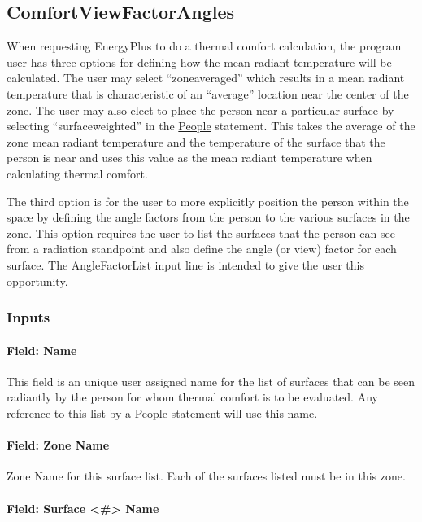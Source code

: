\subsection{ComfortViewFactorAngles}\label{comfortviewfactorangles}

When requesting EnergyPlus to do a thermal comfort calculation, the program user has three options for defining how the mean radiant temperature will be calculated. The user may select ``zoneaveraged'' which results in a mean radiant temperature that is characteristic of an ``average'' location near the center of the zone. The user may also elect to place the person near a particular surface by selecting ``surfaceweighted'' in the \hyperref[people]{People} statement. This takes the average of the zone mean radiant temperature and the temperature of the surface that the person is near and uses this value as the mean radiant temperature when calculating thermal comfort.

The third option is for the user to more explicitly position the person within the space by defining the angle factors from the person to the various surfaces in the zone. This option requires the user to list the surfaces that the person can see from a radiation standpoint and also define the angle (or view) factor for each surface. The AngleFactorList input line is intended to give the user this opportunity.

\subsubsection{Inputs}\label{inputs-1-023}

\paragraph{Field: Name}\label{field-name-1-022}

This field is an unique user assigned name for the list of surfaces that can be seen radiantly by the person for whom thermal comfort is to be evaluated. Any reference to this list by a \hyperref[people]{People} statement will use this name.

\paragraph{Field: Zone Name}\label{field-zone-name-007}

Zone Name for this surface list. Each of the surfaces listed must be in this zone.

\paragraph{Field: Surface \textless{}\#\textgreater{} Name}\label{field-surface-name-002}

